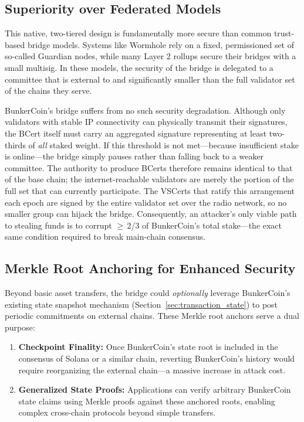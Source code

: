 \documentclass{article}
\begin{document}
\subsection{Superiority over Federated Models}
This native, two-tiered design is fundamentally more secure than common trust-based bridge models. Systems like Wormhole rely on a fixed, permissioned set of so-called Guardian nodes, while many Layer 2 rollups secure their bridges with a small multisig. In these models, the security of the bridge is delegated to a committee that is external to and significantly smaller than the full validator set of the chains they serve.

BunkerCoin's bridge suffers from no such security degradation. Although only validators with stable IP connectivity can physically transmit their signatures, the BCert itself must carry an aggregated signature representing at least two-thirds of \emph{all} staked weight.  If this threshold is not met—because insufficient stake is online—the bridge simply pauses rather than falling back to a weaker committee.  The authority to produce BCerts therefore remains identical to that of the base chain; the internet-reachable validators are merely the portion of the full set that can currently participate.  The VSCerts that ratify this arrangement each epoch are signed by the 
entire validator set over the radio network, so no smaller group can hijack the bridge.  Consequently, an attacker’s only viable path to stealing funds is to corrupt $\geq$\,2/3 of BunkerCoin’s total stake—the exact same condition required to break main-chain consensus.

\subsection{Merkle Root Anchoring for Enhanced Security}
Beyond basic asset transfers, the bridge could \emph{optionally} leverage BunkerCoin's existing state snapshot mechanism (Section~\ref{sec:transaction_state}) to post periodic commitments on external chains. These Merkle root anchors serve a dual purpose:

\begin{enumerate}
    \item \textbf{Checkpoint Finality:} Once BunkerCoin's state root is included in the consensus of Solana or a similar chain, reverting BunkerCoin's history would require reorganizing the external chain—a massive increase in attack cost.
    \item \textbf{Generalized State Proofs:} Applications can verify arbitrary BunkerCoin state claims using Merkle proofs against these anchored roots, enabling complex cross-chain protocols beyond simple transfers.
\end{enumerate}
\end{document}
